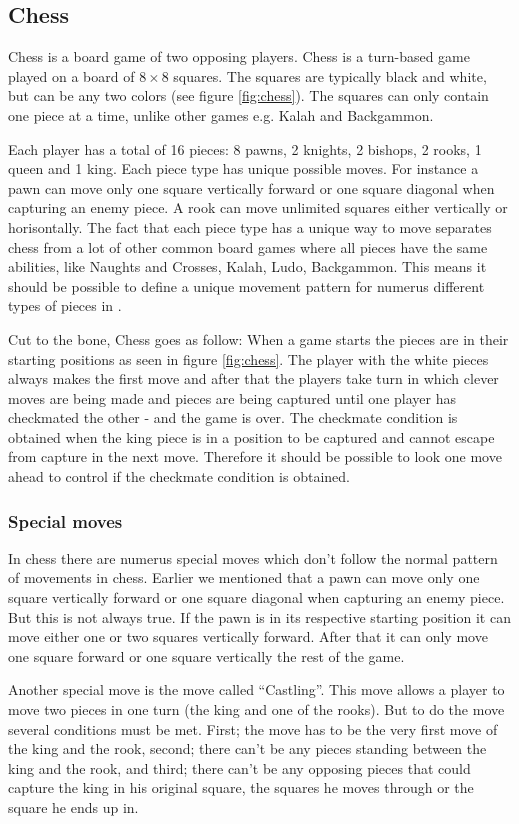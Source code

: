 \subsection{Chess}
Chess is a board game of two opposing players. Chess is a turn-based game played
on a board of $8 \times 8$ squares. The squares are typically black and white,
but can be any two colors (see figure \ref{fig:chess}). The squares can only
contain one piece at a time, unlike other games e.g. Kalah and Backgammon. 

Each player has a total of 16 pieces: 8 pawns, 2 knights, 2 bishops, 2 rooks, 1
queen and 1 king. Each piece type has unique possible moves. For instance a pawn
can move only one square vertically forward or one square diagonal when
capturing an enemy piece. A rook can move unlimited squares either vertically or
horisontally. The fact that each piece type has a unique way to move separates
chess from a lot of other common board games where all pieces have the same
abilities, like Naughts and Crosses, Kalah, Ludo, Backgammon. This means it
should be possible to define a unique movement pattern for numerus different
types of pieces in \productname{}. 

Cut to the bone, Chess goes as follow: When a game starts the pieces are in their
starting positions as seen in figure \ref{fig:chess}. The player with the white
pieces always makes the first move and after that the players take turn in
which clever moves are being made and pieces are being captured until one
player has checkmated the other - and the game is over. The checkmate condition
is obtained when the king piece is in a position to be captured and cannot
escape from capture in the next move. \cite{chessrules} Therefore it should be
possible to look one move ahead to control if the checkmate condition is
obtained.

\subsubsection{Special moves} 
In chess there are numerus special moves which don't follow the normal pattern
of movements in chess. Earlier we mentioned that a pawn can move only one square
vertically forward or one square diagonal when capturing an enemy piece. But
this is not always true. If the pawn is in its respective starting position it
can move either one or two squares vertically forward. After that it can only
move one square forward or one square vertically the rest of the game. 

Another special move is the move called ``Castling''. This move allows a player
to move two pieces in one turn (the king and one of the rooks). But to do the
move several conditions must be met. First; the move has to be the very first
move of the king and the rook, second; there can't be any pieces standing
between the king and the rook, and third; there can't be any opposing pieces
that could capture the king in his original square, the squares he moves through
or the square he ends up in.
\cite{chessrules} 

